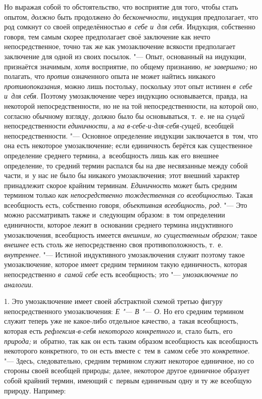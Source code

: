 Но выражая собой то обстоятельство, что восприятие для того,
чтобы стать опытом, {\em должно}
быть продолжено {\em до
бесконечности,} индукция предполагает, что род сомкнут со
своей определённостью {\em в~себе и~для
себя}. Индукция, собственно говоря, тем самым скорее
предполагает своё заключение как нечто непосредственное, точно так же как
умозаключение всякости предполагает заключение для одной из своих посылок.
"--- Опыт, основанный на индукции, признаётся значимым,
{\em хотя} восприятие, по
общему признанию, {\em не завершено;}
но полагать, что
{\em против} означенного
опыта не может найтись никакого
{\em противопоказания,}
можно лишь постольку, поскольку этот опыт истинен
{\em в~себе и~для себя}.
Поэтому умозаключение через индукцию основывается, правда, на
некоторой непосредственности, но не на той непосредственности, на которой
оно, согласно обычному взгляду, должно было бы основываться, т.~е. не на
{\em сущей}
непосредственности
{\em единичности,} а
{\em на в-себе-и-для-себя-сущей,}
всеобщей непосредственности. "--- Основное
определение индукции заключается в~том, что она есть некоторое
умозаключение; если единичность берётся как существенное определение
среднего термина, а~всеобщность лишь как его внешнее определение, то
средний термин распался бы на две несвязанные между собой части, и~у нас не
было бы никакого умозаключения; этот внешний характер принадлежит скорое
крайним терминам. {\em Единичность}
может быть средним термином только
{\em как непосредственно тождественная
со всеобщностью}. Такая всеобщность есть, собственно говоря,
{\em объективная всеобщность,}
{\em род}. "--- Это можно
рассматривать также и~следующим образом: в~том определении единичности,
которое лежит в~основании среднего термина индуктивного умозаключения,
всеобщность имеется {\em внешним,}
{\em но существенным образом;}
такое {\em внешнее}
есть столь же непосредственно своя противоположность, т.~е.
{\em внутреннее}. "---
Истиной индуктивного умозаключения служит поэтому
такое умозаключение, которое имеет средним термином такую
единичность, которая непосредственно
{\em в~самой себе} есть
всеобщность; это "--- {\em умозаключение по
аналогии}.


1. Это умозаключение имеет своей абстрактной схемой третью
фигуру непосредственного умозаключения:
{\em Е "--- В
"--- О}. Но его средним термином служит теперь
уже не какое-либо отдельное качество, а~такая всеобщность, которая есть
{\em рефлексия-в-себя некоторого
конкретного} и, стало быть, его
{\em природа;} и~обратно,
так как он есть таким образом всеобщность как всеобщность некоторого
конкретного, то он есть вместе с~тем в~самом себе это
{\em конкретное}. "---
Здесь, следовательно, средним термином служит некоторое
единичное, но со стороны своей всеобщей природы; далее, некоторое другое
единичное образует собой крайний термин, имеющий с~первым единичным одну и
ту же всеобщую природу. Например:

